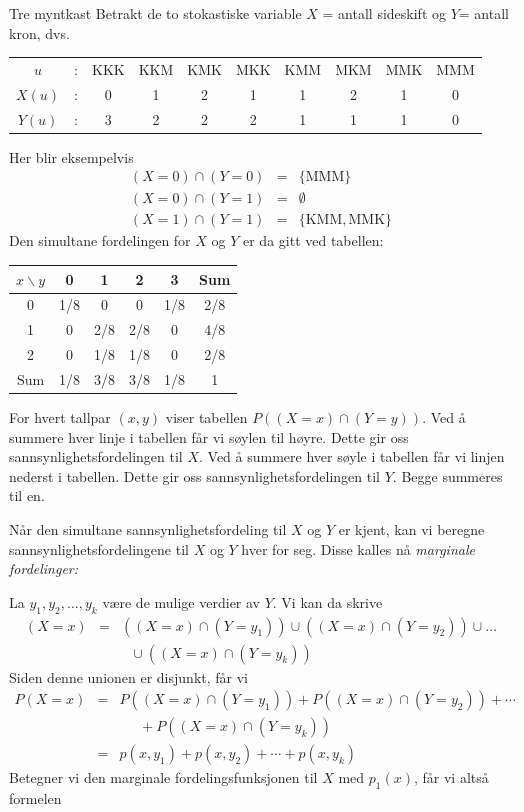 \begin{eksempel}{Tre myntkast}
Betrakt de to stokastiske variable $X$ = antall sideskift og
 $Y$= antall kron, dvs.
\begin{center} \small
\begin{tabular}{cccccccccc}
$u$    &:& KKK & KKM & KMK & MKK & KMM & MKM & MMK & MMM \\
$X(u)$ &:&   0   &   1   &   2   &   1   &   1   &   2   &   1   &   0  \\
$Y(u)$ &:&   3   &   2   &   2   &   2   &   1   &   1   &   1   &   0
\end{tabular}
\end{center}
Her blir eksempelvis
\begin{eqnarray*}
     (X=0)\cap (Y=0)&=&\{\mbox{MMM}\} \\
     (X=0)\cap (Y=1)&=&\emptyset  \\
     (X=1)\cap (Y=1)&=&\{\mbox{KMM}, \mbox{MMK}\}
\end{eqnarray*}
Den simultane fordelingen for $X$ og $Y$ er da gitt ved tabellen:

\begin{center}
 \begin{tabular}{|c|cccc|c|} \hline
 $x\backslash y$ & 0 & 1 & 2 & 3 & Sum \\ \hline
 0 &1/8& 0 & 0 &1/8&2/8 \\
 1 & 0 &2/8&2/8& 0 &4/8 \\
 2 & 0 &1/8&1/8& 0 &2/8 \\ \hline
Sum&1/8&3/8&3/8&1/8& 1 \\ \hline
 \end{tabular}
\end{center}

\noindent For hvert tallpar $(x,y)$ viser tabellen $P((X=x)\cap (Y=y))$.
Ved å summere hver linje i tabellen får vi søylen til høyre.
Dette gir oss sannsynlighetsfordelingen til $X$. Ved å summere
hver søyle i tabellen får vi linjen nederst i tabellen. Dette gir
oss sannsynlighetsfordelingen til $Y$. Begge summeres til en.\\
\end{eksempel}
Når den simultane sannsynlighetsfordeling til $X$ og $Y$ er kjent,
kan vi beregne sannsynlighetsfordelingene til $X$ og $Y$ hver for
seg. Disse kalles nå {\em marginale fordelinger:}

La $y_1, y_2, ..., y_k$ være de mulige verdier av $Y$. Vi kan da
skrive
\begin{eqnarray*}
(X=x)&=&((X=x)\cap (Y=y_1))\cup ((X=x)\cap (Y=y_2))\cup \ldots \\
     & &     \mbox{\ \ \ \ \ \ } \cup ((X=x)\cap (Y=y_k)) 
\end{eqnarray*}
Siden denne unionen er disjunkt, får vi
\begin{eqnarray*}
 P(X=x)&=&P((X=x)\cap (Y=y_1))+P((X=x)\cap (Y=y_2))+\cdots \\
       & & \; \; \; \; \;+P((X=x)\cap (Y=y_k)) \\
       &=&p(x,y_1)+p(x,y_2)+\cdots +p(x,y_k)
\end{eqnarray*}
Betegner vi den marginale fordelingsfunksjonen til $X$ med
$p_1(x)$, får vi altså formelen

